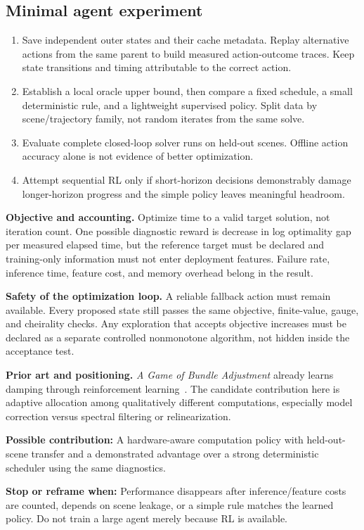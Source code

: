 \documentclass[11pt,a4paper]{article}
\newcommand{\stoprule}[1]{\par\textbf{Stop or reframe when:} #1\par}
\newcommand{\novelty}[1]{\par\textbf{Possible contribution:} #1\par}
\begin{document}
\subsection*{Minimal agent experiment}
\begin{enumerate}
\item Save independent outer states and their cache metadata. Replay alternative actions from the same parent to build measured action-outcome traces. Keep state transitions and timing attributable to the correct action.
\item Establish a local oracle upper bound, then compare a fixed schedule, a small deterministic rule, and a lightweight supervised policy. Split data by scene/trajectory family, not random iterates from the same solve.
\item Evaluate complete closed-loop solver runs on held-out scenes. Offline action accuracy alone is not evidence of better optimization.
\item Attempt sequential RL only if short-horizon decisions demonstrably damage longer-horizon progress and the simple policy leaves meaningful headroom.
\end{enumerate}

\textbf{Objective and accounting.} Optimize time to a valid target solution, not iteration count. One possible diagnostic reward is decrease in log optimality gap per measured elapsed time, but the reference target must be declared and training-only information must not enter deployment features. Failure rate, inference time, feature cost, and memory overhead belong in the result.

\textbf{Safety of the optimization loop.} A reliable fallback action must remain available. Every proposed state still passes the same objective, finite-value, gauge, and cheirality checks. Any exploration that accepts objective increases must be declared as a separate controlled nonmonotone algorithm, not hidden inside the acceptance test.

\textbf{Prior art and positioning.} \emph{A Game of Bundle Adjustment} already learns damping through reinforcement learning~\cite{gameba}. The candidate contribution here is adaptive allocation among qualitatively different computations, especially model correction versus spectral filtering or relinearization.

\novelty{A hardware-aware computation policy with held-out-scene transfer and a demonstrated advantage over a strong deterministic scheduler using the same diagnostics.}
\stoprule{Performance disappears after inference/feature costs are counted, depends on scene leakage, or a simple rule matches the learned policy. Do not train a large agent merely because RL is available.}
\end{document}
